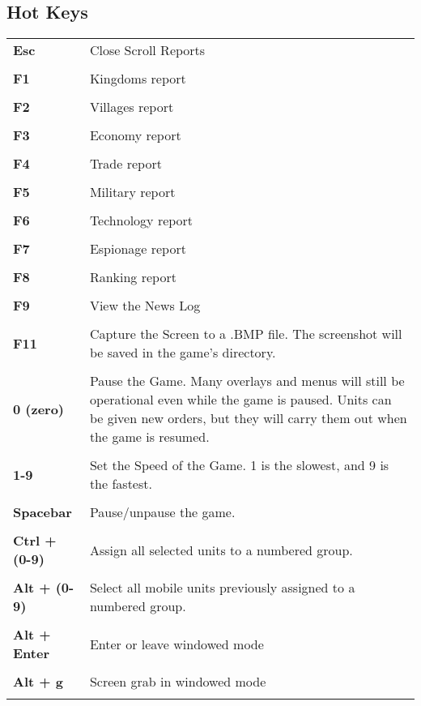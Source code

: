 \subsection{Hot Keys}


\begin{tabular}{p{1in} p{3in}}
    \textbf{Esc} & Close Scroll Reports \\ \\
    \textbf{F1} & Kingdoms report \\ \\
    \textbf{F2} & Villages report \\ \\
    \textbf{F3} & Economy report \\ \\
    \textbf{F4} & Trade report \\\\
    \textbf{F5} & Military report \\ \\
    \textbf{F6} & Technology report \\ \\
    \textbf{F7} & Espionage report \\ \\
    \textbf{F8} & Ranking report \\ \\
    \textbf{F9} & View the News Log \\ \\
    \textbf{F11} & Capture the Screen to a .BMP file. The screenshot will be saved in the game’s directory. \\ \\


    \textbf{0 (zero)} & Pause the Game. Many overlays and menus will still be operational even while the game is paused. Units can be given new orders, but they will carry them out when the game is resumed.\\ \\
    \textbf{1-9} & Set the Speed of the Game. 1 is the slowest, and 9 is the fastest. \\ \\    
    \textbf{Spacebar} & Pause/unpause the game.\\ \\    
    \textbf{Ctrl + (0-9)} & Assign all selected units to a numbered group.\\ \\
    \textbf{Alt + (0-9)} & Select all mobile units previously assigned to a numbered group.\\ \\
    \textbf{Alt + Enter} & Enter or leave windowed mode\\ \\
    \textbf{Alt + g} & Screen grab in windowed mode\\ \\
\end{tabular}

